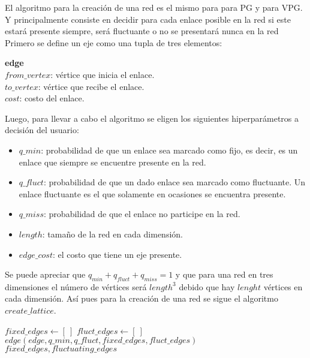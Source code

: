 El algoritmo para la creación de una red es el mismo para para PG y para VPG. Y principalmente consiste en decidir para cada enlace posible en la red si este estará presente siempre, será fluctuante o no se presentará nunca en la red  Primero se define un eje como una tupla de tres elementos:

\begin{framed}
		\noindent \textbf{edge} \\
		$from\_vertex$: vértice que inicia el enlace. \\
		$to\_vertex$: vértice que recibe el enlace. \\
		$cost$: costo del enlace.
\end{framed}

Luego, para llevar a cabo el algoritmo se eligen los siguientes hiperparámetros a decisión del usuario:

\begin{itemize}
  \item $q\_min$: probabilidad de que un enlace sea marcado como fijo, es decir, es un enlace que siempre se encuentre presente en la red.
  \item $q\_fluct$: probabilidad de que un dado enlace sea marcado como fluctuante. Un enlace fluctuante es el que solamente en ocasiones se encuentra presente.
  \item $q\_miss$: probabilidad de que el enlace no participe en la red.
  \item $length$: tamaño de la red en cada dimensión.
  \item $edge\_cost$: el costo que tiene un eje presente.
\end{itemize}

Se puede apreciar que $q_{min} + q_{fluct} + q_{miss} = 1$ y que para una red en tres dimensiones el número de vértices será $length^3$ debido que hay $lenght$ vértices en cada dimensión. Así pues para la creación de una red se sigue el algoritmo $create\_lattice$.

\begin{algorithm}
\begin{algorithmic}[1]
	\State $fixed\_edges \gets [\:]$
	\State $fluct\_edges \gets [\:]$
		\State $edge (edge, q\_min, q\_fluct, fixed\_edges, fluct\_edges)$
	\EndFor
	\State
	\Return $fixed\_edges, fluctuating\_edges$
\EndFunction
\end{algorithmic}
\end{algorithm}

